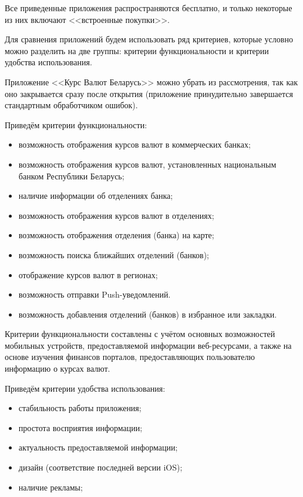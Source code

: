 Все приведенные приложения распространяются бесплатно, и только некоторые из
них включают <<встроенные покупки>>.

Для сравнения приложений будем использовать ряд критериев, которые условно
можно разделить на две группы: критерии функциональности и критерии удобства
использования.

Приложение <<Курс Валют Беларусь>> можно убрать из рассмотрения, так как оно
закрывается сразу после открытия (приложение принудительно завершается
стандартным обработчиком ошибок).

\newpage

Приведём критерии функциональности:
\begin{itemize}
  \item возможность отображения курсов валют в коммерческих банках;
  \item возможность отображения курсов валют, установленных национальным
    банком Республики Беларусь;
  \item наличие информации об отделениях банка;
  \item возможность отображения курсов валют в отделениях;
  \item возможность отображения отделения (банка) на карте;
  \item возможность поиска ближайших отделений (банков);
  \item отображение курсов валют в регионах;
  \item возможность отправки Push-уведомлений.
  \item возможность добавления отделений (банков) в избранное или закладки.
\end{itemize}

Критерии функциональности составлены с учётом основных возможностей
мобильных устройств, предоставляемой информации веб-ресурсами,
а также на основе изучения финансов порталов, предоставляющих пользователю
информацию о курсах валют.

Приведём критерии удобства использования:
\begin{itemize}
  \item стабильность работы приложения;
  \item простота восприятия информации;
  \item актуальность предоставляемой информации;
  \item дизайн (соответствие последней версии iOS);
  \item наличие рекламы;
\end{itemize}

